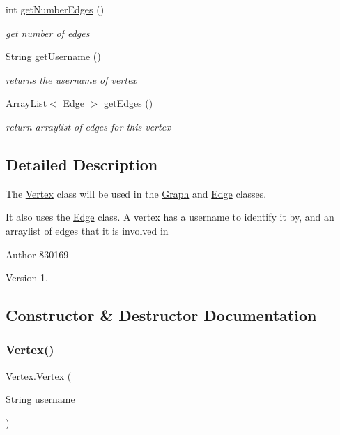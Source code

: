 \begin{DoxyCompactItemize}
int \hyperlink{class_vertex_a3da0cb5ceb6e70ffbdfd84941fa69b4a}{get\+Number\+Edges} ()
\begin{DoxyCompactList}\small\item\em get number of edges \end{DoxyCompactList}\item 
String \hyperlink{class_vertex_a24b931258451256742b50b09b5a8e13f}{get\+Username} ()
\begin{DoxyCompactList}\small\item\em returns the username of vertex \end{DoxyCompactList}\item 
Array\+List$<$ \hyperlink{class_edge}{Edge} $>$ \hyperlink{class_vertex_a25a9ddc7d963c1f7a762d8f6b68376dc}{get\+Edges} ()
\begin{DoxyCompactList}\small\item\em return arraylist of edges for this vertex \end{DoxyCompactList}\end{DoxyCompactItemize}


\subsection{Detailed Description}
The \hyperlink{class_vertex}{Vertex} class will be used in the \hyperlink{class_graph}{Graph} and \hyperlink{class_edge}{Edge} classes. 

It also uses the \hyperlink{class_edge}{Edge} class. A vertex has a username to identify it by, and an arraylist of edges that it is involved in

\begin{DoxyAuthor}{Author}
830169 
\end{DoxyAuthor}
\begin{DoxyVersion}{Version}
1. 
\end{DoxyVersion}


\subsection{Constructor \& Destructor Documentation}
\mbox{\label{class_vertex_a55f0a6d7d075b9d1881ebaaea3859970}} 
\subsubsection{\texorpdfstring{Vertex()}{Vertex()}}
{\footnotesize\ttfamily Vertex.\+Vertex (\begin{DoxyParamCaption}\item[{String}]{username }\end{DoxyParamCaption})}



